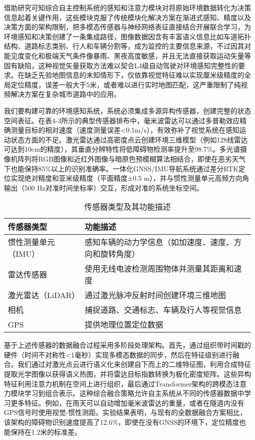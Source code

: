 借助研究可知综合自主控制系统的感知和注意力模块对将原始环境数据转化为决策信息起着关键作用，这些模块克服了传统模块化解决方案在渐进式感知、精度以及决策方面的架构限制，把多模态传感器与神经网络表征直接结合开展联合学习，为环境感知和决策创建了一条集成路径，图像数据因含有丰富语义信息比如车道拓扑结构、道路标志类别、行人和车辆分割等，成为监控的主要信息来源，不过因其对能见度变化和极端天气条件像暴雨、黑夜高度敏感，并且无法直接获取运动矢量等固有缺陷，这种视觉矢量获取方法难以契合L4级自动驾驶对环境感知完整性的要求。在缺乏先验地图信息的未知情形下，仅依靠视觉特征难以实现厘米级精度的全局定位精度，误差一般大于5米，或者难以进行实时地图匹配，这严重限制了纯视频解决方案在复杂城市道路中的应用。

我们要构建可靠的环境感知系统，系统必须集成多源异构传感器，创建完整的状态空间表征。在表4-3所示的典型传感器排布中，毫米波雷达可以通过多普勒效应精确测量目标的相对速度（速度测量误差<0.1m/s），有效弥补了视觉系统在感知运动状态方面的不足。激光雷达通过高密度点云创建环境三维模型（例如128线雷达可达到10cm的精度），其垂直分辨特性将低障碍物检测率提升至98.7\%。多光谱摄像机阵列将RGB图像和近红外图像与暗原色预模糊算法相结合，即使在恶劣天气下也能保持85\%以上的识别准确率。一体化GNSS/IMU导航系统通过差分RTK定位实现绝对精度和亚米级精度（平面精度±0.5 m），并与惯性测量单元高频方向角输出（500 Hz对准时间坐标率）交互，形成对准的系统坐标空间。


\begin{table}[htbp]
	\centering
	\caption{传感器类型及其功能描述}
	\label{tab:sensors}
	\begin{tabular}{ll}
		\toprule
		\textbf{传感器类型} & \textbf{功能描述} \\
		\midrule
		惯性测量单元（IMU） & 感知车辆的动力学信息（如加速度、速度、方向和旋转角度） \\
		雷达传感器 & 使用无线电波检测周围物体并测量其距离和速度 \\
		激光雷达（LiDAR） & 通过激光脉冲反射时间创建环境三维地图 \\
		相机 & 捕捉道路、交通标志、车辆及行人等视觉信息 \\
		GPS & 提供地理位置定位数据 \\
		\bottomrule
	\end{tabular}
\end{table}

基于上述传感器的数据融合过程采用多阶段处理架构。首先，通过组织带时间戳的硬件（时间不对称性<1毫秒）实现多模态数据的同步，然后在特征级别进行融合。我们通过对激光点云进行语义化来创建自下而上的二维特征图，利用合成特征提取光学图像以获得语义热图，并将雷达目标指数转换为极化密度矩阵。这些异构特征利用注意力机制在空间上进行组织，最后通过Transformer架构的跨模态注意力模块学习到组合表示。这种综合融合策略允许自主系统从不同的传感器数据中学习更多特征。例如，在雨天可以自动增加毫米波雷达的重量，或者在隧道内没有GPS信号时使用视觉-惯性测距。实验结果表明，与现有的全数据融合方案相比，该架构的障碍物识别速度提高了12.6\%，即使在没有GNSS的环境下，定位精度也能保持在1.2米的标准差。

